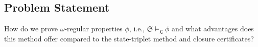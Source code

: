 \documentclass[acmlarge]{acmart}
\begin{document}




\subsection{Problem Statement}
 How do we prove $\omega$-regular properties $\phi$, i.e., $\mathfrak{S} \models_{\mathfrak{L}} \phi$ and what advantages does this method offer compared to the state-triplet method and closure certificates?
 
\end{document}

